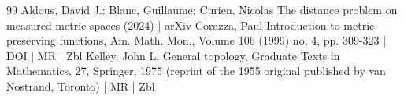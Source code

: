 \documentclass[10pt]{amsart}
\theoremstyle{definition}\newtheorem{defi}[theo]{Definition}\newtheorem{rema}[theo]{Remark}\newtheorem{exam}[theo]{Example}\newtheorem{exem}[theo]{Example}\newtheorem{nota}[theo]{Notation}
\begin{document}
\begin{thebibliography}{99}
 Aldous, David J.; Blanc, Guillaume; Curien, Nicolas The distance problem on measured metric spaces (2024) | arXiv
 Corazza, Paul Introduction to metric-preserving functions, Am. Math. Mon., Volume 106 (1999) no. 4, pp. 309-323 | DOI | MR | Zbl
 Kelley, John L. General topology, Graduate Texts in Mathematics, 27, Springer, 1975 (reprint of the 1955 original published by van Nostrand, Toronto) | MR | Zbl
\end{thebibliography}
\end{document}
